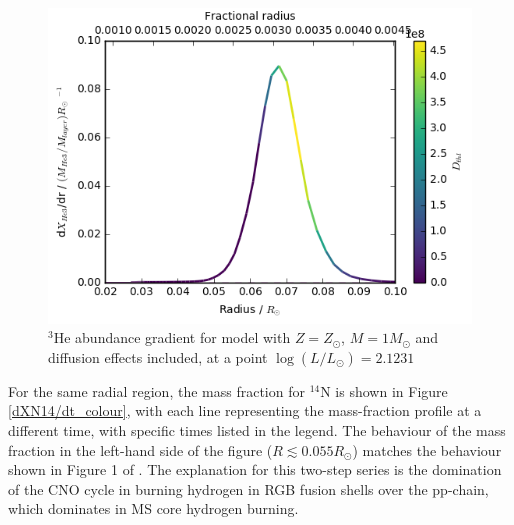 \documentclass[12pt, a4paper]{report}
\begin{document}
\begin{figure}
\begin{center}
\includegraphics[scale=0.7]{../mu_test_data/mu_test_graphs/eq_logL=2p1231_He3_radius_gradient_Dthl_color_crop.png}
\caption{$^{3}$He abundance gradient for model with $Z = Z_{\odot}$, $M = 1M_{\odot}$ and diffusion effects included, at a point $\log(L/L_{\odot}) = 2.1231$}
\label{dHe3/dr_colour}
\end{center}
\end{figure}

For the same radial region, the mass fraction for $^{14}$N is shown in Figure \ref{dXN14/dt_colour}, with each line representing the mass-fraction profile at a different time, with specific times listed in the legend. The behaviour of the mass fraction in the left-hand side of the figure ($R \lesssim 0.055R_{\odot}$) matches the behaviour shown in Figure 1 of \cite{2007A&A...467L..15C}. The explanation for this two-step series is the domination of the CNO cycle in burning hydrogen in RGB fusion shells over the pp-chain, which dominates in MS core hydrogen burning. 
\end{document}
